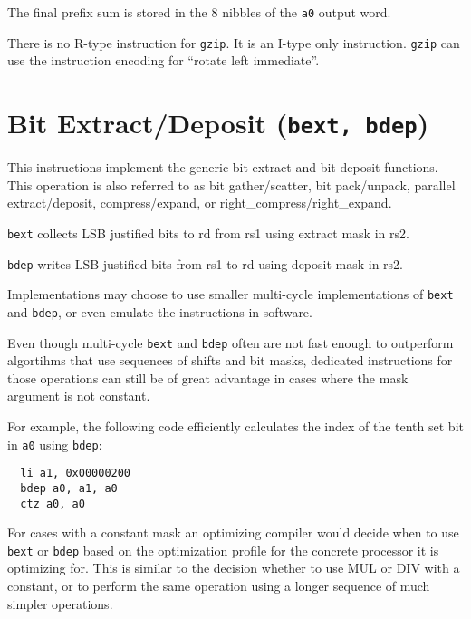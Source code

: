 The final prefix sum is stored in the 8 nibbles of the {\tt a0} output word.



There is no R-type instruction for {\tt gzip}. It is an I-type only instruction.
\texttt{gzip} can use the instruction encoding for ``rotate left immediate''.


\section{Bit Extract/Deposit (\texttt{bext,\ bdep})}

This instructions implement the generic bit extract and bit deposit functions.
This operation is also referred to as bit gather/scatter, bit pack/unpack,
parallel extract/deposit, compress/expand, or right\_compress/right\_expand.

\texttt{bext} collects LSB justified bits to rd from rs1 using extract mask in rs2.

\texttt{bdep} writes LSB justified bits from rs1 to rd using deposit mask in rs2.



Implementations may choose to use smaller multi-cycle implementations of
\texttt{bext} and \texttt{bdep}, or even emulate the instructions in software.

Even though multi-cycle \texttt{bext} and \texttt{bdep} often are not fast
enough to outperform algortihms that use sequences of shifts and bit masks,
dedicated instructions for those operations can still be of great advantage in
cases where the mask argument is not constant.

For example, the following code efficiently calculates the index of the tenth
set bit in {\tt a0} using \texttt{bdep}:

\begin{verbatim}
  li a1, 0x00000200
  bdep a0, a1, a0
  ctz a0, a0
\end{verbatim}

For cases with a constant mask an optimizing compiler would decide when to use
\texttt{bext} or \texttt{bdep} based on the optimization profile for the
concrete processor it is optimizing for. This is similar to the decision
whether to use MUL or DIV with a constant, or to perform the same operation
using a longer sequence of much simpler operations.


